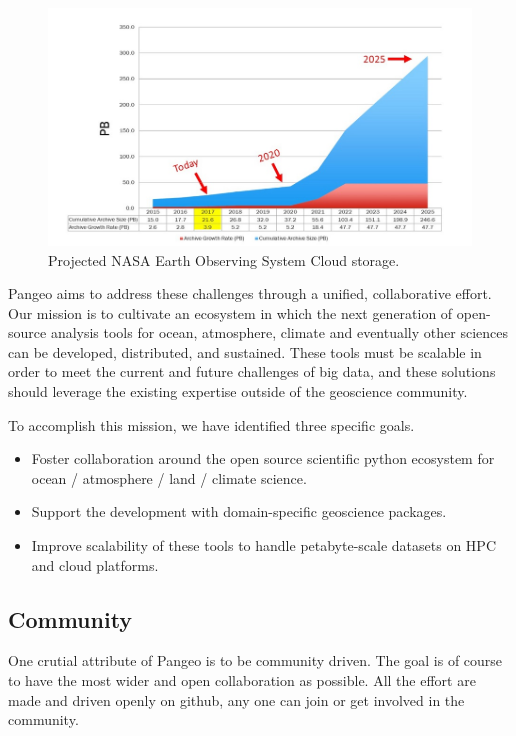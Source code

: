 \documentclass{article}
\begin{document}
\begin{figure}
  \centering
  \includegraphics[width=\columnwidth]{EOSDIS_archive_growth_updated_resize.jpg}
  \caption{\label{nasa_cloud_growth} Projected NASA Earth Observing System Cloud storage\cite{b2}.}
\end{figure}


Pangeo aims to address these challenges through a unified, collaborative effort.
Our mission is to cultivate an ecosystem in which the next generation of open-source analysis tools for ocean, atmosphere, climate and eventually other sciences can be developed, distributed, and sustained. These tools must be scalable in order to meet the current and future challenges of big data, and these solutions should leverage the existing expertise outside of the geoscience community.

To accomplish this mission, we have identified three specific goals.
\begin{itemize}
\item Foster collaboration around the open source scientific python ecosystem for ocean / atmosphere / land / climate science.
\item Support the development with domain-specific geoscience packages.
\item Improve scalability of these tools to handle petabyte-scale datasets on HPC and cloud platforms.
\end{itemize}

\subsection{Community}
\label{ssec:community}

One crutial attribute of Pangeo is to be community driven. The goal is of course to have the most wider and open collaboration as possible. All the effort are made and driven openly on github\cite{b3}, any one can join or get involved in the community. 
\end{document}
